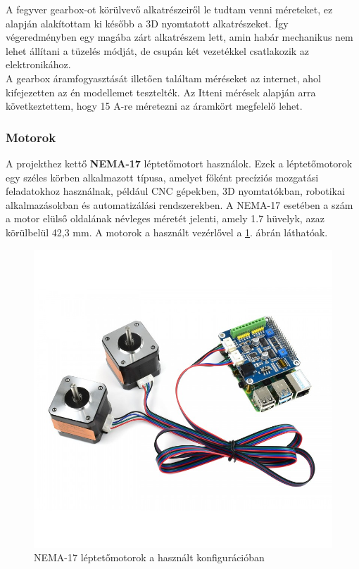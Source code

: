 \documentclass[12pt,a4paper]{article}
\begin{document}
A fegyver gearbox-ot körülvevő alkatrészeiről le tudtam venni méreteket, ez alapján alakítottam ki később a 3D nyomtatott alkatrészeket. Így végeredményben egy magába zárt alkatrészem lett, amin habár mechanikus nem lehet állítani a tüzelés módját, de csupán két vezetékkel csatlakozik az elektronikához. \\

A gearbox áramfogyasztását illetően találtam méréseket az internet, ahol kifejezetten az én modellemet tesztelték. Az Itteni mérések alapján arra következtettem, hogy 15 A-re méretezni az áramkört megfelelő lehet. \cite{aisroftteszt}

\subsubsection*{Motorok}

A projekthez kettő \textbf{NEMA-17} léptetőmotort használok\cite{nema17}. Ezek a léptetőmotorok egy széles körben alkalmazott típusa, amelyet főként precíziós mozgatási feladatokhoz használnak, például CNC gépekben, 3D nyomtatókban, robotikai alkalmazásokban és automatizálási rendszerekben. A NEMA-17 esetében a szám a motor elülső oldalának névleges méretét jelenti, amely 1.7 hüvelyk, azaz körülbelül 42,3 mm. A motorok a használt vezérlővel a \ref{fig:mech_stepper}. ábrán láthatóak.\\

\begin{figure}[h!]
	\centering
	\includegraphics[width=0.8\linewidth]{mech_stepper}
	\caption{NEMA-17 léptetőmotorok a használt konfigurációban}
	\label{fig:mech_stepper}
\end{figure}
\end{document}
